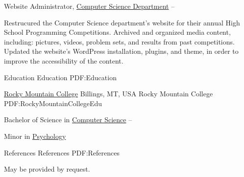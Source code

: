 \documentclass[letterpaper,MMMyyyy,nonstopmode]{simpleresumecv}
\begin{document}
\begin{Body}
\Gap

\Entry
Website Administrator,
\href{http://cs.rocky.edu/programming-competitions/high-school-competions/}
{Computer Science Department}
\hfill
{} --
\begin{Detail}
\BulletItem
Restrucured the Computer Science department's website for their annual High School Programming Competitions.
\BulletItem
Archived and organized media content, including: pictures, videos, problem sets, and results from past competitions.
\BulletItem
Updated the website's WordPress installation, plugins, and theme, in order to improve the accessibility of the content.
\end{Detail}


\Section
{Education}
{Education}
{PDF:Education}

\SubSection
{\href{http://www.rocky.edu/}
{Rocky Mountain College}
\hfill Billings, MT, USA}
{Rocky Mountain College}
{PDF:RockyMountainCollegeEdu}

\Entry
Bachelor of Science in
\href{http://cs.rocky.edu/}
{Computer Science}
\hfill
{} --
\begin{Detail}
\BulletItem
Minor in 
\href{http://rocky.edu/academics/academic-programs/undergraduate-majors/psychology/}
{Psychology}
\end{Detail}


\Section
{References}
{References}
{PDF:References}

May be provided by request.

\end{Body}
\end{document}
